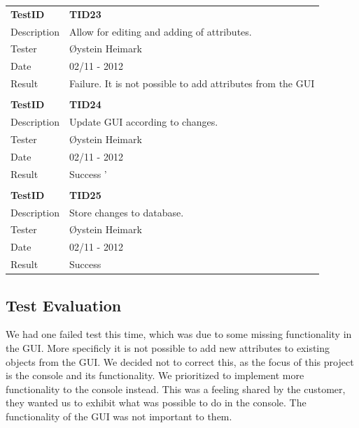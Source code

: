 \begin{table}
\begin{tabular}{ l p{13cm} }
\bf{TestID}		&\bf{TID23}			\\
Description	&Allow for editing and adding of attributes.	\\
Tester		&Øystein Heimark	\\
Date			&02/11 - 2012	\\
Result		&Failure. It is not possible to add attributes from the GUI			\\
\hline \\ [-2.0ex]

\bf{TestID}		&\bf{TID24}			\\
Description	&Update GUI according to changes.	\\
Tester		&Øystein Heimark	\\
Date			&02/11 - 2012	\\
Result		&Success		'	\\
\hline \\ [-2.0ex]

\bf{TestID}		&\bf{TID25}			\\
Description	&Store changes to database.\\
Tester		&Øystein Heimark	\\
Date			&02/11 - 2012	\\
Result		&Success			\\
\hline

\end{tabular}
\label{table:sp3testresults}
\end{table}

\subsection{Test Evaluation}
We had one failed test this time, which was due to some missing functionality in the GUI. More specificly it is not possible to add new attributes to existing objects from the GUI. We decided not to correct this, as the focus of this project is the console and its functionality. We prioritized to implement more functionality to the console instead. This was a feeling shared by the customer, they wanted us to exhibit what was possible to do in the console. The functionality of the GUI was not important to them.

